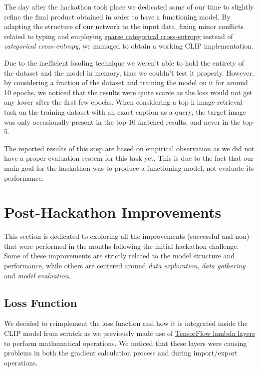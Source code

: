 \documentclass[10pt,twocolumn,letterpaper]{article}
\begin{document}
The day after the hackathon took place we dedicated some of our time to slightly refine the final product obtained in order to have a functioning model.
By adapting the structure of our network to the input data, fixing minor conflicts related to typing and employing \href{https://www.tensorflow.org/api_docs/python/tf/keras/losses/SparseCategoricalCrossentropy}{sparse categorical cross-entropy} instead of \textit{categorical cross-entropy}, we managed to obtain a working CLIP implementation.

Due to the inefficient loading technique we weren't able to hold the entirety of the dataset and the model in memory, thus we couldn't test it properly.
However, by considering a fraction of the dataset and training the model on it for around 10 epochs, we noticed that the results were quite scarce as the loss would not get any lower after the first few epochs.
When considering a top-k image-retrieval task on the training dataset with an exact caption as a query, the target image was only occasionally present in the top-10 matched results, and never in the top-5.

The reported results of this step are based on empirical observation as we did not have a proper evaluation system for this task yet.
This is due to the fact that our main goal for the hackathon was to produce a functioning model, not evaluate its performance.


\section{Post-Hackathon Improvements}
This section is dedicated to exploring all the improvements (successful and non) that were performed in the months following the initial hackathon challenge.
Some of these improvements are strictly related to the model structure and performance, while others are centered around \textit{data exploration}, \textit{data gathering} and \textit{model evaluation}.

\subsection{Loss Function}
We decided to reimplement the loss function and how it is integrated inside the CLIP model from scratch as we previously made use of \href{https://www.tensorflow.org/api_docs/python/tf/keras/layers/Lambda}{TensorFlow lambda layers} to perform mathematical operations.
We noticed that these layers were causing problems in both the gradient calculation process and during import/export operations.
\end{document}
